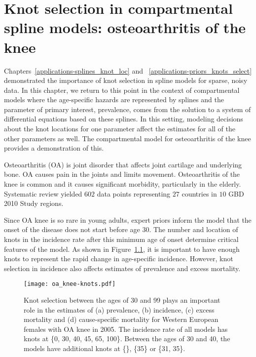 \chapter{Knot selection in compartmental spline models: osteoarthritis of the knee}
\label{applications-con_fit_splines}

Chapters~\ref{applications-splines_knot_loc} and
~\ref{applications-priors_knots_select} demonstrated the importance of
knot selection in spline models for sparse, noisy data. In this
chapter, we return to this point in the context of compartmental
models where the age-specific hazards are represented by splines and
the parameter of primary interest, prevalence, comes from the solution
to a system of differential equations based on these splines. In this
setting, modeling decisions about the knot locations for one parameter
affect the estimates for all of the other parameters as well.  The
compartmental model for osteoarthritis of the knee provides a
demonstration of this.

Osteoarthritis (OA) is joint disorder that affects joint cartilage and
underlying bone.  OA causes pain in the joints and limits movement.
Osteoarthritis of the knee is common and it causes significant
morbidity, particularly in the
elderly. \cite{felson_epidemiology_1988, felson_incidence_1995}
Systematic review yielded $602$ data points representing $27$ countries
in $10$ GBD 2010 Study regions.

Since OA knee is so rare in young adults, expert priors inform the
model that the onset of the disease does not start before age 30.  The
number and location of knots in the incidence rate after this minimum
age of onset determine critical features of the model. As shown in
Figure~\ref{fig:app-oa knee knots}, it is important to have enough
knots to represent the rapid change in age-specific incidence.
However, knot selection in incidence also affects estimates of
prevalence and excess mortality.

    \begin{figure}[h]
        \begin{center}
            \texttt{[image: oa\_knee-knots.pdf]}
            \caption{Knot selection between the ages of 30 and 99
              plays an important role in the estimates of 
              (a) prevalence, (b) incidence,
              (c) excess mortality and (d) cause-specific mortality 
              for Western European females
              with OA knee in 2005.  The
              incidence rate of all models has knots at \{0, 30,
              40, 45, 65, 100\}.  Between the ages
              of 30 and 40, the models have additional knots at \{\}, \{35\}
              or \{31, 35\}.}
            \label{fig:app-oa knee knots}
        \end{center}
    \end{figure}

